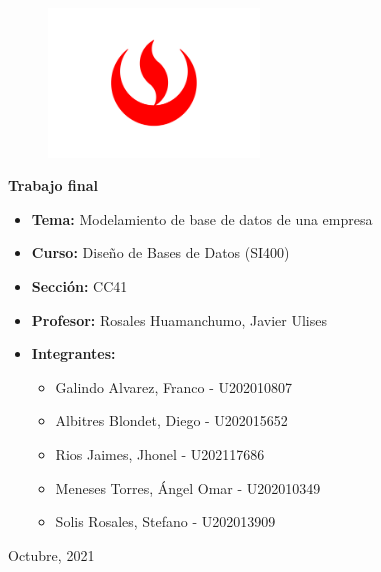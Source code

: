 \documentclass[12pt, spanish]{article}
\begin{document}
\begin{figure}[h]
  \centering
  \includegraphics[width=0.5\textwidth]{logo-upc}
\end{figure}

\begin{center}
  \Large\textbf{Trabajo final}
\end{center}

\vspace{1cm}

\begin{itemize}
  \item \textbf{Tema:} Modelamiento de base de datos de una empresa
  \item \textbf{Curso:} Diseño de Bases de Datos (SI400)
  \item \textbf{Sección:} CC41
  \item \textbf{Profesor:} Rosales Huamanchumo, Javier Ulises
  \item \textbf{Integrantes:}
        \begin{itemize}
          \item Galindo Alvarez, Franco - U202010807
          \item Albitres Blondet, Diego - U202015652
          \item Rios Jaimes, Jhonel - U202117686
          \item Meneses Torres, Ángel Omar - U202010349
          \item Solis Rosales, Stefano - U202013909
        \end{itemize}
\end{itemize}

\vspace{5cm}

\begin{center}
  Octubre, 2021
\end{center}
\end{document}
